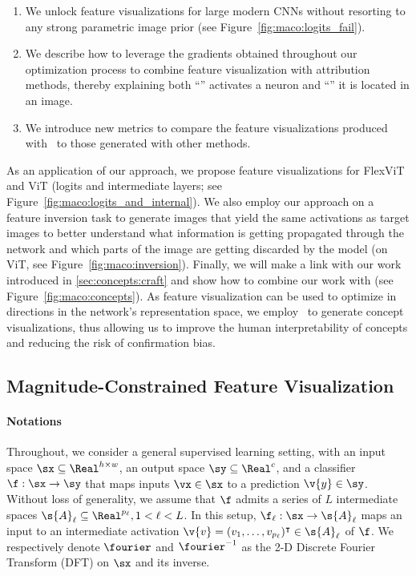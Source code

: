 \begin{enumerate}[label=(\textit{\textbf{\roman*}})]

\item{We unlock feature visualizations for large modern CNNs without resorting to any strong parametric image prior (see Figure~\ref{fig:maco:logits_fail}).}

\item{We describe how to leverage the gradients obtained throughout our optimization process to combine feature visualization with attribution methods, thereby explaining both ``\what'' activates a neuron and ``\where'' it is located in an image.}

\item{We introduce new metrics to compare the feature visualizations produced with \magfv~to those generated with other methods.}
\end{enumerate}
As an application of our approach, we propose feature visualizations for FlexViT \cite{beyer2022flexivit} and ViT \cite{Dosovitskiy2021-zy} (logits and intermediate layers;  see Figure~\ref{fig:maco:logits_and_internal}).  We also employ our approach on a feature inversion task to generate images that yield the same activations as target images to better understand what information is getting propagated through the network and which parts of the image are getting discarded by the model (on ViT, see Figure~\ref{fig:maco:inversion}).
Finally, we will make a link with our work introduced in \autoref{sec:concepts:craft} and show how to combine our work with \craft (see Figure~\ref{fig:maco:concepts}). As feature visualization can be used to optimize in directions in the network's representation space, we employ \magfv~to generate concept visualizations, thus allowing us to improve the human interpretability of concepts and reducing the risk of confirmation bias. 

\subsection{Magnitude-Constrained Feature Visualization}




\paragraph{Notations}

Throughout, we consider a general supervised learning setting, with an input space $\sx \subseteq \Real^{h \times w}$, an output space $\sy \subseteq \Real^c$, and a classifier $\f : \sx \to \sy$ that maps inputs $\vx \in \sx$ to a prediction $\v{y} \in \sy$.
Without loss of generality, we assume that $\f$ admits a series of $L$ intermediate spaces $\s{A}_\ell \subseteq \Real^{p_\ell}, 1 < \ell < L$.
In this setup, $\f_\ell : \sx \to \s{A}_\ell$ maps an input to an intermediate activation $\v{v} = (v_1, \ldots, v_{p_\ell})^\intercal \in \s{A}_\ell$ of $\f$.
We respectively denote $\fourier$ and $\fourier^{-1}$ as the 2-D Discrete Fourier Transform (DFT) on $\sx$ and its inverse.








